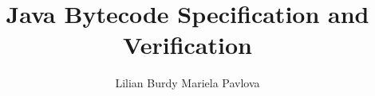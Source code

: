 \documentclass[a4paper,11pt]{article}
\begin{document}
\title{ Java Bytecode Specification and Verification }


\author{
 Lilian Burdy
 Mariela Pavlova
}


\maketitle
\begin{abstract}

\end{abstract}





%






\end{document}
